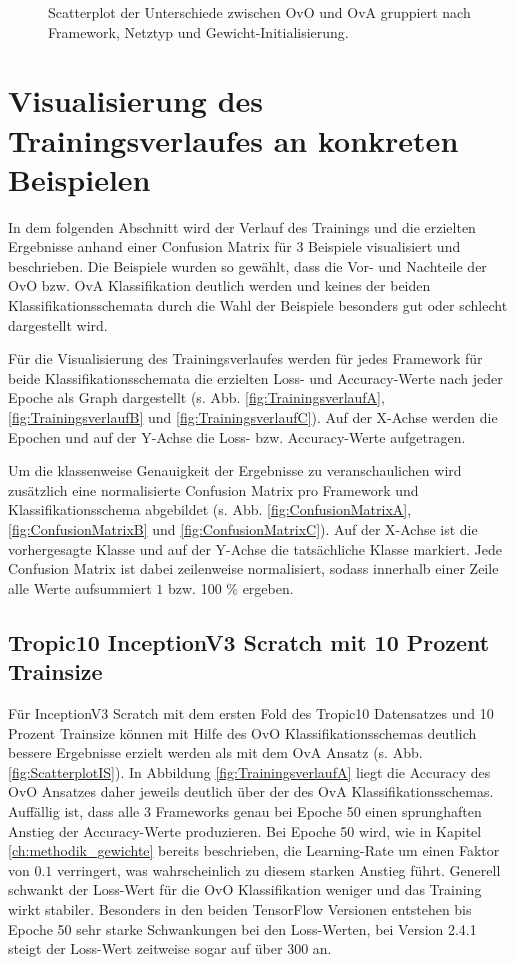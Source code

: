 \begin{figure}[H]
\begin{adjustbox}{width=1.4\textwidth, center}

\end{adjustbox}
\caption{Scatterplot der Unterschiede zwischen OvO und OvA gruppiert nach Framework, Netztyp und Gewicht-Initialisierung.}
\label{fig:ScatterplotGesamt}
\end{figure}
\newpage
\section{Visualisierung des Trainingsverlaufes an konkreten Beispielen}
\label{ch:Beispiele}
In dem folgenden Abschnitt wird der Verlauf des Trainings und die erzielten Ergebnisse anhand einer Confusion Matrix für 3 Beispiele visualisiert und beschrieben. Die Beispiele wurden so gewählt, dass die Vor- und Nachteile der OvO bzw. OvA Klassifikation deutlich werden und keines der beiden Klassifikationsschemata durch die Wahl der Beispiele besonders gut oder schlecht dargestellt wird.

Für die Visualisierung des Trainingsverlaufes werden für jedes Framework für beide Klassifikationsschemata die erzielten Loss- und Accuracy-Werte nach jeder Epoche als Graph dargestellt (s. Abb. \ref{fig:TrainingsverlaufA}, \ref{fig:TrainingsverlaufB} und \ref{fig:TrainingsverlaufC}). Auf der X-Achse werden die Epochen und auf der Y-Achse die Loss- bzw. Accuracy-Werte aufgetragen.

Um die klassenweise Genauigkeit der Ergebnisse zu veranschaulichen wird zusätzlich eine normalisierte Confusion Matrix pro Framework und Klassifikationsschema abgebildet (s. Abb. \ref{fig:ConfusionMatrixA}, \ref{fig:ConfusionMatrixB} und \ref{fig:ConfusionMatrixC}). Auf der X-Achse ist die vorhergesagte Klasse und auf der Y-Achse die tatsächliche Klasse markiert. Jede Confusion Matrix ist dabei zeilenweise normalisiert, sodass innerhalb einer Zeile alle Werte aufsummiert $1$ bzw. 100 \%  ergeben.
\subsection{Tropic10 InceptionV3 Scratch mit 10 Prozent Trainsize}
\label{ch:BeispielA}
Für InceptionV3 Scratch mit dem ersten Fold des Tropic10 Datensatzes und 10 Prozent Trainsize können mit Hilfe des OvO Klassifikationsschemas deutlich bessere Ergebnisse erzielt werden als mit dem OvA Ansatz (s. Abb. \ref{fig:ScatterplotIS}).
In Abbildung \ref{fig:TrainingsverlaufA} liegt die Accuracy des OvO Ansatzes daher jeweils deutlich über der des OvA Klassifikationsschemas. Auffällig ist, dass alle 3 Frameworks genau bei Epoche 50 einen sprunghaften Anstieg der Accuracy-Werte produzieren. Bei Epoche 50 wird, wie in Kapitel \ref{ch:methodik_gewichte} bereits beschrieben, die Learning-Rate um einen Faktor von $0.1$ verringert, was wahrscheinlich zu diesem starken Anstieg führt. Generell schwankt der Loss-Wert für die OvO Klassifikation weniger und das Training wirkt stabiler. Besonders in den beiden TensorFlow \cite{tensorflow} Versionen entstehen bis Epoche 50 sehr starke Schwankungen bei den Loss-Werten, bei Version 2.4.1 steigt der Loss-Wert zeitweise sogar auf über 300 an.

